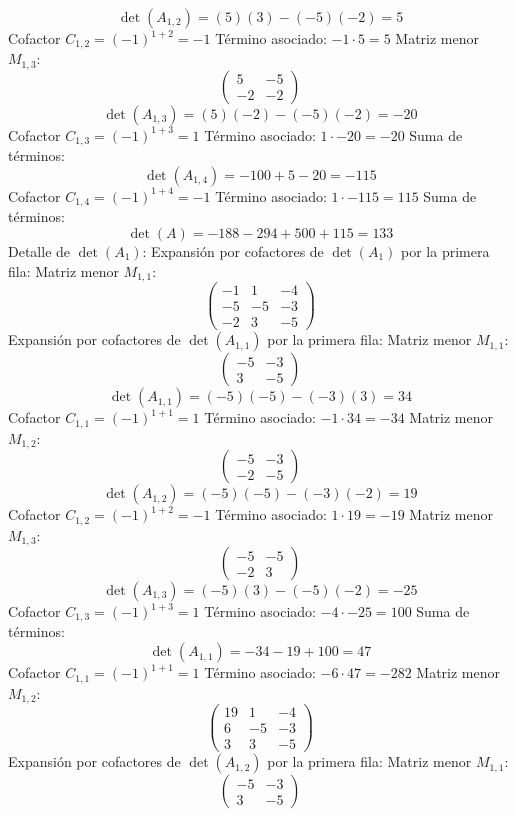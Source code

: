 \documentclass{article}
\begin{document}
\[\det(A_{1,2}) = (5)(3) - (-5)(-2) = 5\]
Cofactor $C_{1,2} = (-1)^{1+2} = -1$
Término asociado: $ -1 \cdot 5 = 5 $
Matriz menor $M_{1,3}$:
\[\begin{pmatrix}5 & -5 \\ -2 & -2\end{pmatrix}\]
\[\det(A_{1,3}) = (5)(-2) - (-5)(-2) = -20\]
Cofactor $C_{1,3} = (-1)^{1+3} = 1$
Término asociado: $ 1 \cdot -20 = -20 $
Suma de términos:
\[\det(A_{1,4}) = -100 + 5 - 20 = -115\]
Cofactor $C_{1,4} = (-1)^{1+4} = -1$
Término asociado: $ 1 \cdot -115 = 115 $
Suma de términos:
\[\det(A) = -188 - 294 + 500 + 115 = 133\]
Detalle de $\det(A_{1})$:
Expansión por cofactores de $\det(A_{1})$ por la primera fila:
Matriz menor $M_{1,1}$:
\[\begin{pmatrix}-1 & 1 & -4 \\ -5 & -5 & -3 \\ -2 & 3 & -5\end{pmatrix}\]
Expansión por cofactores de $\det(A_{1,1})$ por la primera fila:
Matriz menor $M_{1,1}$:
\[\begin{pmatrix}-5 & -3 \\ 3 & -5\end{pmatrix}\]
\[\det(A_{1,1}) = (-5)(-5) - (-3)(3) = 34\]
Cofactor $C_{1,1} = (-1)^{1+1} = 1$
Término asociado: $ -1 \cdot 34 = -34 $
Matriz menor $M_{1,2}$:
\[\begin{pmatrix}-5 & -3 \\ -2 & -5\end{pmatrix}\]
\[\det(A_{1,2}) = (-5)(-5) - (-3)(-2) = 19\]
Cofactor $C_{1,2} = (-1)^{1+2} = -1$
Término asociado: $ 1 \cdot 19 = -19 $
Matriz menor $M_{1,3}$:
\[\begin{pmatrix}-5 & -5 \\ -2 & 3\end{pmatrix}\]
\[\det(A_{1,3}) = (-5)(3) - (-5)(-2) = -25\]
Cofactor $C_{1,3} = (-1)^{1+3} = 1$
Término asociado: $ -4 \cdot -25 = 100 $
Suma de términos:
\[\det(A_{1,1}) = -34 - 19 + 100 = 47\]
Cofactor $C_{1,1} = (-1)^{1+1} = 1$
Término asociado: $ -6 \cdot 47 = -282 $
Matriz menor $M_{1,2}$:
\[\begin{pmatrix}19 & 1 & -4 \\ 6 & -5 & -3 \\ 3 & 3 & -5\end{pmatrix}\]
Expansión por cofactores de $\det(A_{1,2})$ por la primera fila:
Matriz menor $M_{1,1}$:
\[\begin{pmatrix}-5 & -3 \\ 3 & -5\end{pmatrix}\]
\end{document}
